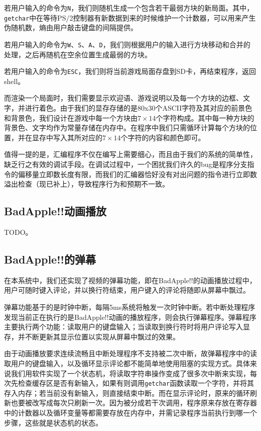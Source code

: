 \documentclass[11pt,utf8]{report}
\begin{document}
若用户输入的命令为\texttt{N}，我们则随机生成一个包含若干最弱方块的新局面。其中，\texttt{getchar}中在等待PS/2控制器有新数据到来的时候维护一个计数器，可以用来产生伪随机数，熵由用户敲击键盘的间隔提供。

若用户输入的命令为\texttt{W}、\texttt{S}、\texttt{A}、\texttt{D}，我们则根据用户的输入进行方块移动和合并的处理，之后再随机在空余位置生成最弱的方块。

若用户输入的命令为\texttt{ESC}，我们则将当前游戏局面存盘到SD卡，再结束程序，返回shell。

而渲染一个局面时，我们需要显示欢迎语、游戏说明以及每一个方块的边框、文字，并进行着色。由于我们的显存存储的是80x30个ASCII字符及其对应的前景色和背景色，我们设计在游戏中每一个方块由$7\times14$个字符构成。其中每一种方块的背景色、文字均作为常量存储在内存中。在程序中我们只需循环计算每个方块的位置，并在显存中写入其所对应的$7\times14$个字符的内容和颜色即可。

值得一提的是，汇编程序不仅在编写上需要细心，而且由于我们的系统的简单性，缺乏行之有效的调试手段。在调试过程中，一个困扰我们许久的bug是程序分支指令的偏移量立即数长度有限，而我们的汇编器恰好没有对出问题的指令进行立即数溢出检查（现已补上），导致程序行为和预期不一致。

\subsection{BadApple!!动画播放} 
	\par TODO。

\subsection{BadApple!!的弹幕}

在本系统中，我们还实现了视频的弹幕功能，即在BadApple!!的动画播放过程中，用户可随时键入评论，并以换行符结束，用户键入的评论将随即从屏幕中飘过。

弹幕功能基于的是时钟中断，每隔5ms系统将触发一次时钟中断。若中断处理程序发现当前正在执行的是BadApple!!动画的播放程序，则会执行弹幕程序。弹幕程序主要执行两个功能：读取用户的键盘输入；当读取到换行符时将用户评论写入显存，并不断更新其显示位置以实现从屏幕中飘过的效果。

由于动画播放要求连续流畅且中断处理程序不支持被二次中断，故弹幕程序中的读取用户的键盘输入，以及循环显示评论都不能简单地使用阻塞的实现方式。具体来说我们用软件实现了一个状态机，将读取字符串操作变成了很多次中断来实现，每次先检查缓存区是否有新输入，如果有则调用\texttt{getchar}函数读取一个字符，并将其存入内存；若当前没有新输入，则直接结束中断。而在显示评论时，原来的循环刷新也要被改写成每次只刷新一次。因为被分成若干次调用，程序原来存放在寄存器中的计数器以及循环变量等都需要存放在内存中，并需记录程序当前执行到哪一个步骤，这些就是状态机的状态。
\end{document}
